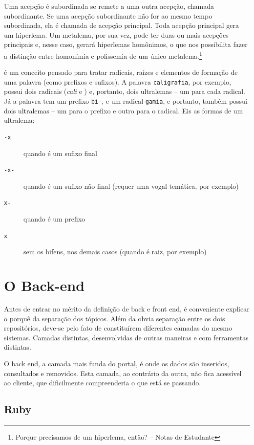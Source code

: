 Uma acepção é subordinada se remete a uma outra acepção, chamada subordinante. Se uma acepção
subordinante não for ao mesmo tempo subordinada, ela é chamada de acepção principal. Toda
acepção principal gera um hiperlema. Um metalema, por sua vez, pode ter duas ou mais acepções
principais e, nesse caso, gerará hiperlemas homônimos, o que nos possibilita fazer a distinção
entre homonímia e polissemia de um único metalema.\footnote{Porque precisamos de um hiperlema,
então? -- Notas de Estudante}

 é um conceito pensado para tratar radicais, raízes e elementos de formação de
uma palavra (como prefixos e sufixos). A palavra \texttt{caligrafia}, por exemplo, possui dois
radicais (\emph{cali} e ) e, portanto, dois ultralemas – um para cada radical. Já
a palavra  tem um prefixo \texttt{bi-}, e um radical \texttt{gamia}, e portanto,
também possui dois ultralemas – um para o prefixo e outro para o radical. Eis as formas de um
ultralema:
\begin{description}
    \item[\texttt{-x}] quando é um sufixo final
    \item[\texttt{-x-}] quando é um sufixo não final (requer uma vogal temática, por
    exemplo)
    \item[\texttt{x-}] quando é um prefixo
    \item[\texttt{x}] sem os hifens, nos demais casos (quando é raiz, por exemplo)
\end{description}

\section{O Back-end}
\label{sec:back-end}

Antes de entrar no mérito da definição de back e front end, é conveniente explicar o porquê da
separação dos tópicos. Além da obvia separação entre os dois repositórios, deve-se pelo fato de
constituírem diferentes camadas do mesmo sistemas. Camadas distintas, desenvolvidas de outras
maneiras e com ferramentas distintas.

O back end, a camada mais funda do portal, é onde os dados são inseridos, consultados e removidos.
Esta camada, ao contrário da outra, não fica acessível ao cliente, que dificilmente compreenderia
o que está se passando.

\subsection{Ruby}
\label{subsec:ruby}

